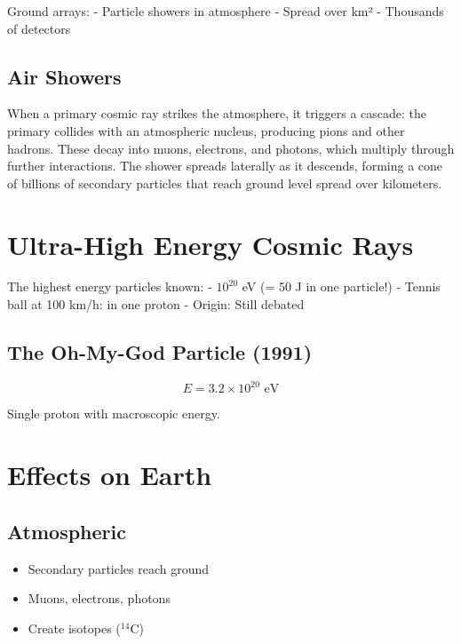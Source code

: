 \documentclass[
  11pt,
  letterpaper,
  twoside,
  openright]{book}
\providecommand{\tightlist}{%
  \setlength{\itemsep}{0pt}\setlength{\parskip}{0pt}}
\begin{document}
Ground arrays: - Particle showers in atmosphere - Spread over km² -
Thousands of detectors

\subsection{Air Showers}\label{air-showers}

When a primary cosmic ray strikes the atmosphere, it triggers a cascade:
the primary collides with an atmospheric nucleus, producing pions and
other hadrons. These decay into muons, electrons, and photons, which
multiply through further interactions. The shower spreads laterally as
it descends, forming a cone of billions of secondary particles that
reach ground level spread over kilometers.

\section{Ultra-High Energy Cosmic
Rays}\label{ultra-high-energy-cosmic-rays}

The highest energy particles known: - \(10^{20}\) eV (= 50 J in one
particle!) - Tennis ball at 100 km/h: in one proton - Origin: Still
debated

\subsection{The Oh-My-God Particle
(1991)}\label{the-oh-my-god-particle-1991}

\[
E = 3.2 \times 10^{20} \text{ eV}
\]

Single proton with macroscopic energy.

\section{Effects on Earth}\label{effects-on-earth}

\subsection{Atmospheric}\label{atmospheric}

\begin{itemize}
\tightlist
\item
  Secondary particles reach ground
\item
  Muons, electrons, photons
\item
  Create isotopes (\(^{14}\)C)
\end{itemize}
\end{document}
